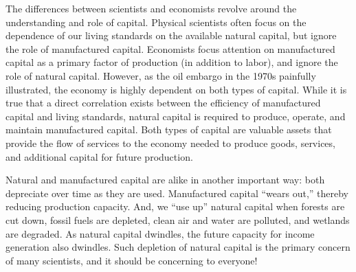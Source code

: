 The differences between scientists and economists revolve around 
the understanding and role of capital.
Physical scientists often focus on the dependence of our
living standards on the available natural capital, but ignore the role of manufactured capital. 
Economists focus attention on manufactured capital 
as a primary factor of production (in addition to labor), 
and ignore the role of natural capital. 
However, as the oil embargo in the 1970s 
painfully illustrated, the economy is highly dependent on both types of capital.
While it is true that a direct correlation exists between the efficiency of manufactured capital
and living standards, natural capital is required 
to produce, operate, and maintain manufactured capital. Both types of capital are valuable
assets that provide the flow of services to the economy needed to produce
goods, services, and additional capital for future production.

Natural and manufactured capital are alike in another important way:
both depreciate over time as they are used.
Manufactured capital ``wears out,'' thereby reducing production capacity. 
And, we ``use up'' natural capital when forests are cut
down, fossil fuels are depleted, clean air and water are polluted, 
and wetlands are degraded. 
As natural capital dwindles, the future
capacity for income generation also dwindles. 
Such depletion of natural capital is the primary concern of many scientists, 
and it should be concerning to everyone!


